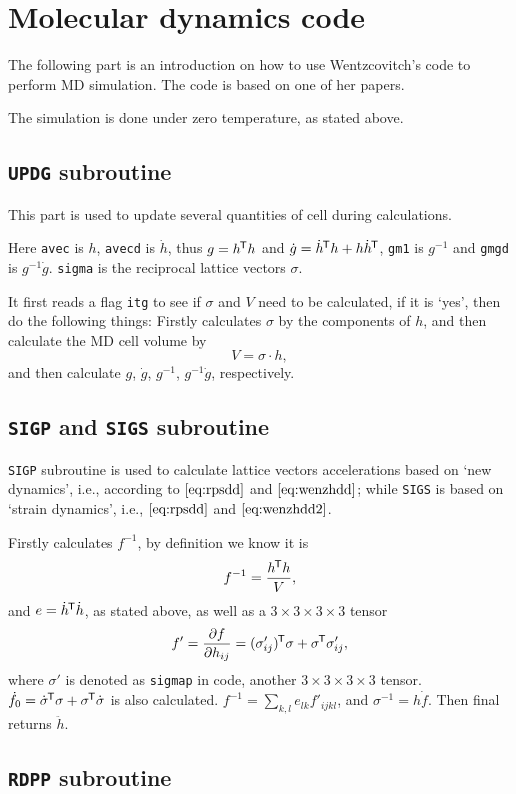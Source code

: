 
\section{Molecular dynamics code}

The following part is an introduction on how to use
Wentzcovitch's code to perform MD simulation. The code is
based on one of her papers.\cite{Wentzcovitch:1991ka}

The simulation is done under zero temperature, as stated above.




\subsection{\texttt{UPDG} subroutine}
This part is used to update several quantities of cell during calculations.

Here \texttt{avec} is $h$, \texttt{avecd} is $\dot{ h }$, thus $g = h^{\mkern-1.5mu\mathsf{T}} h$ 
and $\dot{g}  = \dot{ h }^{\mkern-1.5mu\mathsf{T}} h + h \dot{ h }^{\mkern-1.5mu\mathsf{T}}$, \texttt{gm1} is $g^{-1}$
and \texttt{gmgd} is $g^{-1} \dot{g}$. \texttt{sigma} is the reciprocal lattice
vectors $\sigma$.

It first reads a flag \texttt{itg} to see if $\sigma$ and $V$ need to be calculated,
if it is `yes', then do the following things:
Firstly calculates $\sigma$ by the components of $h$, and then calculate the 
MD cell volume by
\begin{equation}
  V = \sigma \cdot h,
\end{equation}
and then calculate $g$, $\dot{ g }$, $g^{-1}$, $g^{-1}\dot{g}$, respectively.

\subsection{\texttt{SIGP} and \texttt{SIGS} subroutine}

\texttt{SIGP} subroutine is used to calculate lattice vectors accelerations 
based on `new dynamics', i.e., according to $\eqref{eq:rpsdd}$ and
$\eqref{eq:wenzhdd}$; while \texttt{SIGS} is based on `strain dynamics',
i.e., $\eqref{eq:rpsdd}$ and $\eqref{eq:wenzhdd2}$.

Firstly calculates $f^{-1}$, by definition we know it is
\begin{equation}
  f^{-1} = \frac{ h ^{\mkern-1.5mu\mathsf{T}} h }{ V },
\end{equation}
and $e = \dot{ h }^{\mkern-1.5mu\mathsf{T}} \dot{ h }$, as stated above, as well as
a $3\times 3 \times 3 \times 3$ tensor
\begin{equation}
  f ' = \frac{ \partial f }{ \partial h_{ij} } = (\sigma'_{ij})^{\mkern-1.5mu\mathsf{T}} \sigma
  + \sigma ^{\mkern-1.5mu\mathsf{T}} \sigma'_{ij},
\end{equation}
where $\sigma'$ is denoted as \texttt{sigmap} in code, another $3\times 3
\times 3 \times 3$ tensor.
$\dot{f}_0 = \dot{ \sigma } ^{\mkern-1.5mu\mathsf{T}} \sigma + \sigma ^{\mkern-1.5mu\mathsf{T}} \dot{ \sigma }$ is 
also calculated.
$f^{-1} = \sum_{k, l} e_{lk} f'_{ijkl}$, and $\sigma^{-1} = h \dot{ f }$.
Then final returns $\ddot{h}$.





\subsection{\texttt{RDPP} subroutine}